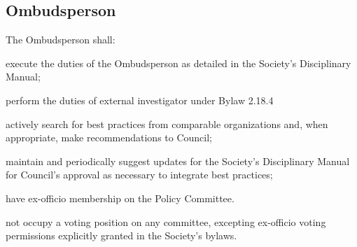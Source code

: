 \subsection{Ombudsperson}
\begin{longenum}[ label*=\thesubsection.\arabic*., align=left]
	\item The Ombudsperson shall: 
    \begin{longenum}[ label*=\arabic*., align=left]
\item execute the duties of the Ombudsperson as detailed in the Society's Disciplinary Manual; 
\item perform the duties of external investigator under Bylaw 2.18.4
\item actively search for best practices from comparable organizations and, when appropriate, make recommendations to Council;
\item maintain and periodically suggest updates for the Society's Disciplinary Manual for Council's approval
as necessary to integrate best practices;
\item have ex-officio membership on the Policy Committee.
\item not occupy a voting position on any committee, excepting ex-officio voting permissions explicitly granted in the Society's bylaws.
\end{longenum}
\end{longenum}

